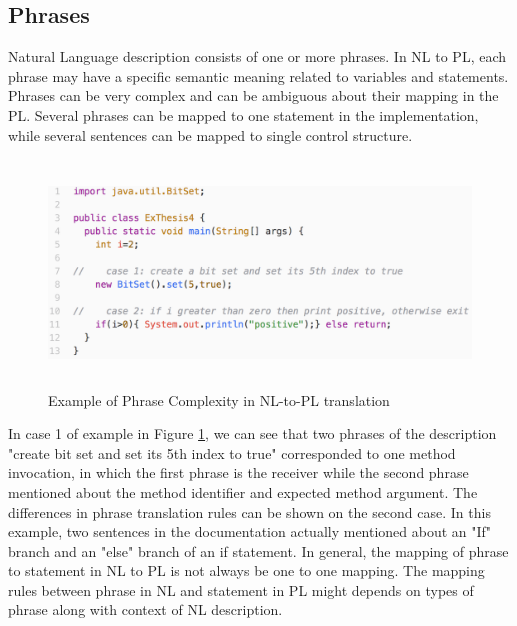 \subsection{Phrases}
Natural Language description consists of one or more phrases. In NL to PL, each phrase may have a specific semantic  meaning related to variables and statements. Phrases can be very complex and can be ambiguous about their mapping in the PL. Several phrases can be mapped to one statement in the implementation, while several sentences can be mapped to single control structure. \\

\begin{figure}[htp]
	\centering
	\includegraphics[width=14cm,height=6cm]{resources/fig_phrase_example.png}%
	\caption[Example of Phrase Complexity in NL-to-PL translation]{Example of Phrase Complexity in NL-to-PL translation} 
	\label{fig:PhraseExample}
\end{figure}

In case 1 of example in Figure \ref{fig:PhraseExample}, we can see that two phrases of the description "create bit set and set its 5th index to true" corresponded to one method invocation, in which the first phrase is the receiver while the second phrase mentioned about the method identifier and expected method argument. The differences in phrase translation rules can be shown on the second case. In this example, two sentences in the documentation actually mentioned about an "If" branch and an "else" branch of an if statement. In general, the mapping of phrase to statement in NL to PL is not always be one to one mapping. The mapping rules between phrase in NL and statement in PL might depends on types of phrase along with context of NL description.
   
